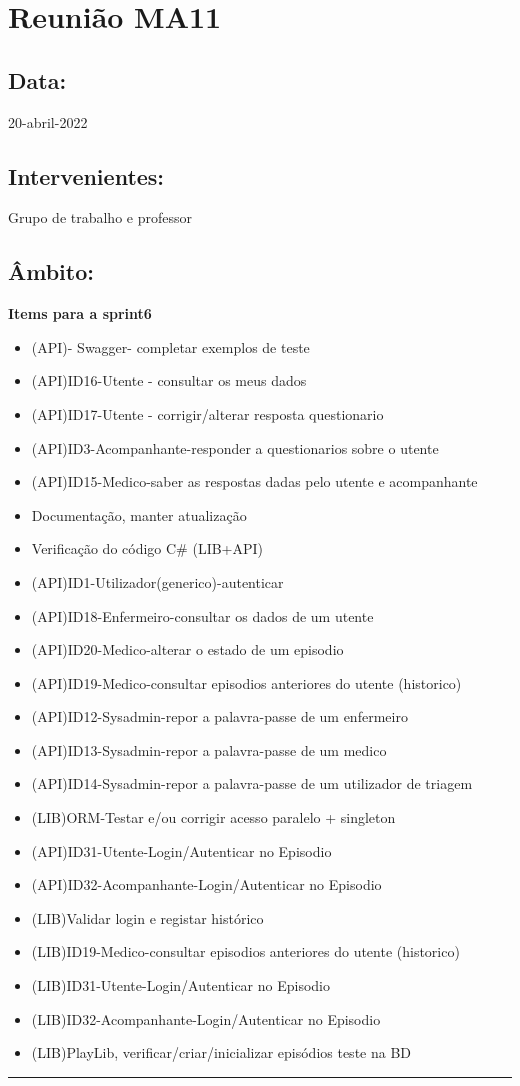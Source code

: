 \section{Reunião MA11}\label{reuniaoMA11}

\subsection*{Data:}
20-abril-2022

\subsection*{Intervenientes:}
Grupo de trabalho e professor

\subsection*{Âmbito:}

\textbf{Items para a sprint6}

\begin{itemize}
	\item (API)- Swagger- completar exemplos de teste
	\item (API)ID16-Utente - consultar os meus dados
	\item (API)ID17-Utente - corrigir/alterar resposta questionario
	\item (API)ID3-Acompanhante-responder a questionarios sobre o utente
	\item (API)ID15-Medico-saber as respostas dadas pelo utente e acompanhante
	\item Documentação, manter atualização
	\item Verificação do código C\# (LIB+API)
	\item (API)ID1-Utilizador(generico)-autenticar
	\item (API)ID18-Enfermeiro-consultar os dados de um utente
	\item (API)ID20-Medico-alterar o estado de um episodio
	\item (API)ID19-Medico-consultar episodios anteriores do utente (historico)
	\item (API)ID12-Sysadmin-repor a palavra-passe de um enfermeiro
	\item (API)ID13-Sysadmin-repor a palavra-passe de um medico
	\item (API)ID14-Sysadmin-repor a palavra-passe de um utilizador de triagem
	\item (LIB)ORM-Testar e/ou corrigir acesso paralelo + singleton
	\item (API)ID31-Utente-Login/Autenticar no Episodio
	\item (API)ID32-Acompanhante-Login/Autenticar no Episodio
	\item (LIB)Validar login e registar histórico
	\item (LIB)ID19-Medico-consultar episodios anteriores do utente (historico)
	\item (LIB)ID31-Utente-Login/Autenticar no Episodio
	\item (LIB)ID32-Acompanhante-Login/Autenticar no Episodio
	\item (LIB)PlayLib, verificar/criar/inicializar episódios teste na BD
\end{itemize}

\noindent \rule{\linewidth}{0.4pt}
\newline